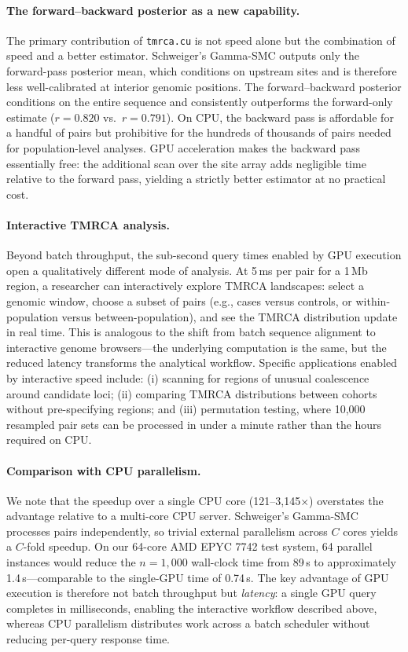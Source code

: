 \documentclass[10pt,letterpaper]{article}
\begin{document}
\paragraph{The forward--backward posterior as a new capability.}
The primary contribution of \texttt{tmrca.cu} is not speed alone but the combination of speed and a better estimator.
Schweiger's Gamma-SMC outputs only the forward-pass posterior mean, which conditions on upstream sites and is therefore less well-calibrated at interior genomic positions.
The forward--backward posterior conditions on the entire sequence and consistently outperforms the forward-only estimate ($r = 0.820$ vs.\ $r = 0.791$).
On CPU, the backward pass is affordable for a handful of pairs but prohibitive for the hundreds of thousands of pairs needed for population-level analyses.
GPU acceleration makes the backward pass essentially free: the additional scan over the site array adds negligible time relative to the forward pass, yielding a strictly better estimator at no practical cost.

\paragraph{Interactive TMRCA analysis.}
Beyond batch throughput, the sub-second query times enabled by GPU execution open a qualitatively different mode of analysis.
At 5\,ms per pair for a 1\,Mb region, a researcher can interactively explore TMRCA landscapes: select a genomic window, choose a subset of pairs (e.g., cases versus controls, or within-population versus between-population), and see the TMRCA distribution update in real time.
This is analogous to the shift from batch sequence alignment to interactive genome browsers---the underlying computation is the same, but the reduced latency transforms the analytical workflow.
Specific applications enabled by interactive speed include: (i) scanning for regions of unusual coalescence around candidate loci; (ii) comparing TMRCA distributions between cohorts without pre-specifying regions; and (iii) permutation testing, where 10{,}000 resampled pair sets can be processed in under a minute rather than the hours required on CPU.

\paragraph{Comparison with CPU parallelism.}
We note that the speedup over a single CPU core (121--3{,}145$\times$) overstates the advantage relative to a multi-core CPU server.
Schweiger's Gamma-SMC processes pairs independently, so trivial external parallelism across $C$ cores yields a $C$-fold speedup.
On our 64-core AMD EPYC 7742 test system, 64 parallel instances would reduce the $n=1{,}000$ wall-clock time from 89\,s to approximately 1.4\,s---comparable to the single-GPU time of 0.74\,s.
The key advantage of GPU execution is therefore not batch throughput but \emph{latency}: a single GPU query completes in milliseconds, enabling the interactive workflow described above, whereas CPU parallelism distributes work across a batch scheduler without reducing per-query response time.
\end{document}
